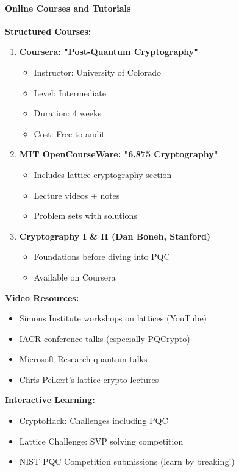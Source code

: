 \documentclass[11pt,a4paper]{article}
\begin{document}
\paragraph{Online Courses and Tutorials}

\textbf{Structured Courses:}

\begin{enumerate}
    \item \textbf{Coursera: "Post-Quantum Cryptography"}
    \begin{itemize}
        \item Instructor: University of Colorado
        \item Level: Intermediate
        \item Duration: 4 weeks
        \item Cost: Free to audit
    \end{itemize}
    
    \item \textbf{MIT OpenCourseWare: "6.875 Cryptography"}
    \begin{itemize}
        \item Includes lattice cryptography section
        \item Lecture videos + notes
        \item Problem sets with solutions
    \end{itemize}
    
    \item \textbf{Cryptography I \& II (Dan Boneh, Stanford)}
    \begin{itemize}
        \item Foundations before diving into PQC
        \item Available on Coursera
    \end{itemize}
\end{enumerate}

\textbf{Video Resources:}
\begin{itemize}
    \item Simons Institute workshops on lattices (YouTube)
    \item IACR conference talks (especially PQCrypto)
    \item Microsoft Research quantum talks
    \item Chris Peikert's lattice crypto lectures
\end{itemize}

\textbf{Interactive Learning:}
\begin{itemize}
    \item CryptoHack: Challenges including PQC
    \item Lattice Challenge: SVP solving competition
    \item NIST PQC Competition submissions (learn by breaking!)
\end{itemize}
\end{document}
